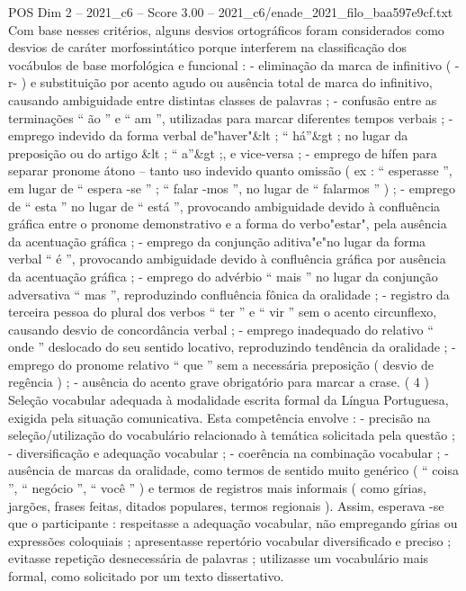 \begin{textsample}{POS Dim 2 – 2021\_c6 – Score 3.00 – 2021\_c6/enade\_2021\_filo\_baa597e9cf.txt}
Com base nesses critérios, alguns desvios ortográficos foram considerados como desvios de caráter morfossintático porque interferem na classificação dos vocábulos de base morfológica e funcional : - eliminação da marca de infinitivo ( -r- ) e substituição por acento agudo ou ausência total de marca do infinitivo, causando ambiguidade entre distintas classes de palavras ; - confusão entre as terminações “ ão ” e “ am ”, utilizadas para marcar diferentes tempos verbais ; - emprego indevido da forma verbal de"haver"\&lt ; “ há”\&gt ; no lugar da preposição ou do artigo \&lt ; “ a”\&gt ;, e vice-versa ; - emprego de hífen para separar pronome átono – tanto uso indevido quanto omissão ( ex : “ esperasse ”, em lugar de “ espera -se ” ; “ falar -mos ”, no lugar de “ falarmos ” ) ; - emprego de “ esta ” no lugar de “ está ”, provocando ambiguidade devido à confluência gráfica entre o pronome demonstrativo e a forma do verbo"estar", pela ausência da acentuação gráfica ; - emprego da conjunção aditiva"e"no lugar da forma verbal “ é ”, provocando ambiguidade devido à confluência gráfica por ausência da acentuação gráfica ; - emprego do advérbio “ mais ” no lugar da conjunção adversativa “ mas ”, reproduzindo confluência fônica da oralidade ; - registro da terceira pessoa do plural dos verbos “ ter ” e “ vir ” sem o acento circunflexo, causando desvio de concordância verbal ; - emprego inadequado do relativo “ onde ” deslocado do seu sentido locativo, reproduzindo tendência da oralidade ; - emprego do pronome relativo “ que ” sem a necessária preposição ( desvio de regência ) ; - ausência do acento grave obrigatório para marcar a crase. ( 4 ) Seleção vocabular adequada à modalidade escrita formal da Língua Portuguesa, exigida pela situação comunicativa.
Esta competência envolve : - precisão na seleção/utilização do vocabulário relacionado à temática solicitada pela questão ; - diversificação e adequação vocabular ; - coerência na combinação vocabular ; - ausência de marcas da oralidade, como termos de sentido muito genérico ( “ coisa ”, “ negócio ”, “ você ” ) e termos de registros mais informais ( como gírias, jargões, frases feitas, ditados populares, termos regionais ).
Assim, esperava -se que o participante : respeitasse a adequação vocabular, não empregando gírias ou expressões coloquiais ; apresentasse repertório vocabular diversificado e preciso ; evitasse repetição desnecessária de palavras ; utilizasse um vocabulário mais formal, como solicitado por um texto dissertativo.

\end{textsample}
